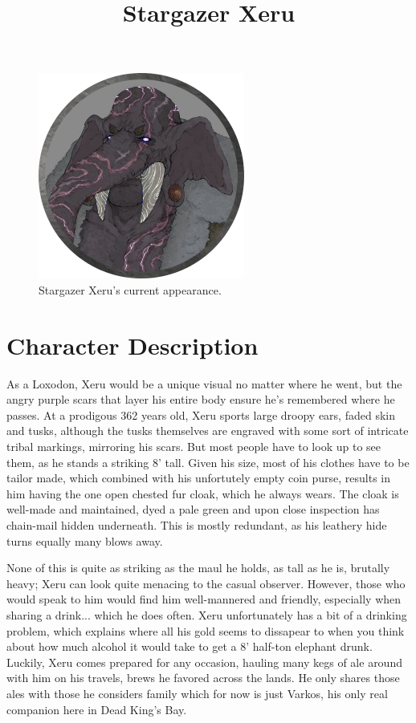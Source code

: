 \documentclass[12pt]{article}
\begin{document}
 
\title{Stargazer Xeru}
\date{}

\maketitle
\begin{figure}[!htb]
  \centering
  \includegraphics[width=.7\textwidth]{./resources/Stargazer_Xeru}
  \caption{Stargazer Xeru's current appearance.}
\end{figure}

\clearpage

\section{Character Description}

As a Loxodon, Xeru would be a unique visual no matter where he went, but the
angry purple scars that layer his entire body ensure he's remembered where he
passes. At a prodigous 362 years old, Xeru sports large droopy ears, faded skin
and tusks, although the tusks themselves are engraved with some sort of
intricate tribal markings, mirroring his scars. But most people have to look up
to see them, as he stands a striking 8' tall. Given his size, most of his
clothes have to be tailor made, which combined with his unfortutely empty coin
purse, results in him having the one open chested fur cloak, which he always
wears. The cloak is well-made and maintained, dyed a pale green and upon close
inspection has chain-mail hidden underneath. This is mostly redundant, as his
leathery hide turns equally many blows away.

None of this is quite as striking as the maul he holds, as tall as he is,
brutally heavy; Xeru can look quite menacing to the casual observer. However,
those who would speak to him would find him well-mannered and friendly,
especially when sharing a drink... which he does often. Xeru unfortunately has
a bit of a drinking problem, which explains where all his gold seems to
dissapear to when you think about how much alcohol it would take to get a 8'
half-ton elephant drunk. Luckily, Xeru comes prepared for any occasion, hauling
many kegs of ale around with him on his travels, brews he favored across the
lands. He only shares those ales with those he considers family which for now is
just Varkos, his only real companion here in Dead King's Bay.
\end{document}
